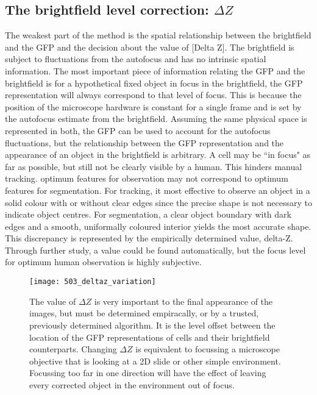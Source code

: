 \subsection{The brightfield level correction: $\Delta Z$}

The weakest part of the method is the spatial relationship between the brightfield and the GFP and the decision about the value of [Delta Z]. The brightfield is subject to fluctuations from the autofocus and has no intrinsic spatial information. The most important piece of information relating the GFP and the brightfield is for a hypothetical fixed object in focus in the brightfield, the GFP representation will always correspond to that level of focus. This is because the position of the microscope hardware is constant for a single frame and is set by the autofocus estimate from the brightfield. Assuming the same physical space is represented in both, the GFP can be used to account for the autofocus fluctuations, but the relationship between the GFP representation and the appearance of an object in the brightfield is arbitrary. A cell may be ``in focus" as far as possible, but still not be clearly visible by a human. This hinders manual tracking. optimum features for observation may not correspond to optimum features for segmentation. For tracking, it most effective to observe an object in a solid colour with or without clear edges since the precise shape is not necessary to indicate object centres. For segmentation, a clear object boundary with dark edges and a smooth, uniformally coloured interior yields the most accurate shape. This discrepancy is represented by the empirically determined value, delta-Z. Through further study, a value could be found automatically, but the focus level for optimum human observation is highly subjective.

\begin{figure}[h!]
 \centering
 \texttt{[image: 503\_deltaz\_variation]}
 \caption[Varying $\Delta Z$]{
 	The value of $\Delta Z$ is very important to the final appearance of the images, but must be determined empiracally, or by a trusted, previously determined algorithm. It is the level offset between the location of the GFP representations of cells and their brightfield counterparts. Changing $\Delta Z$ is equivalent to focussing a microscope objective that is looking at a 2D slide or other simple environment. Focussing too far in one direction will have the effect of leaving every corrected object in the environment out of focus.
 }
 \label{fig:deltazvariation}
\end{figure}

